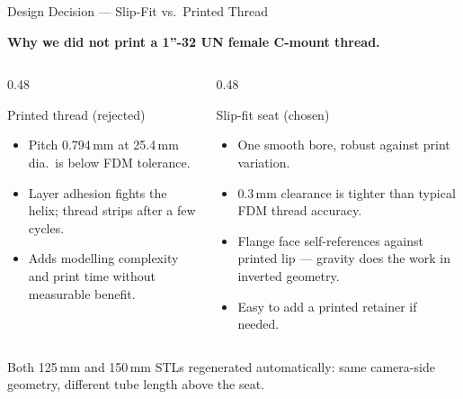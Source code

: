 \documentclass[aspectratio=169,11pt]{beamer}
\begin{document}
\begin{frame}{Design Decision --- Slip-Fit vs.\ Printed Thread}

  \textbf{Why we did not print a 1''-32 UN female C-mount thread.}

  \vspace{0.3em}

  \begin{columns}[T]
    \begin{column}{0.48\textwidth}
      \begin{block}{Printed thread (rejected)}
        \footnotesize
        \begin{itemize}\itemsep=0pt
          \item Pitch 0.794\,mm at 25.4\,mm dia.\ is below FDM tolerance.
          \item Layer adhesion fights the helix; thread strips after a few cycles.
          \item Adds modelling complexity and print time without measurable benefit.
        \end{itemize}
      \end{block}
    \end{column}
    \begin{column}{0.48\textwidth}
      \begin{block}{Slip-fit seat (chosen)}
        \footnotesize
        \begin{itemize}\itemsep=0pt
          \item One smooth bore, robust against print variation.
          \item 0.3\,mm clearance is tighter than typical FDM thread accuracy.
          \item Flange face self-references against printed lip --- gravity does the work in inverted geometry.
          \item Easy to add a printed retainer if needed.
        \end{itemize}
      \end{block}
    \end{column}
  \end{columns}

  \vspace{0.3em}

  \footnotesize
  Both 125\,mm and 150\,mm STLs regenerated automatically: same camera-side
  geometry, different tube length above the seat.

\end{frame}
\end{document}
